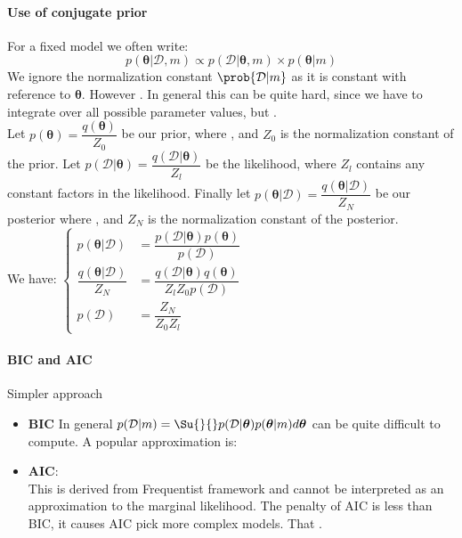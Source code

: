 \paragraph{Use of conjugate prior}
For a fixed model we often write:
$$p(\bm{\theta}|\mathcal{D},m) \propto p(\mathcal{D}|\bm{\theta},m)\times p(\bm{\theta}|m)$$
We ignore the normalization constant $\prob{\mathcal{D}|m}$ as it is constant with reference to
$\bm{\theta}$. However . In general this can
be quite hard, since we have to integrate over all possible parameter values, but .\\
Let $p(\bm{\theta})=\dfrac{q(\bm{\theta})}{Z_{0}}$ be our prior, where , and $Z_{0}$ is the normalization constant of the prior.
Let $p(\mathcal{D}|\bm{\theta})=\dfrac{q(\mathcal{D}|\bm{\theta})}{Z_{l}}$ be the 
likelihood, where $Z_{l}$ contains any constant factors in the likelihood. Finally let
$p(\bm{\theta}|\mathcal{D})=\dfrac{q(\bm{\theta}|\mathcal{D})}{Z_{N}}$ be our posterior
where , and $Z_{N}$ is the normalization constant of the posterior.\\
We have:
$
\begin{cases}
    p(\bm{\theta}|\mathcal{D}) &= \dfrac{p(\mathcal{D}|\bm{\theta})p(\bm{\theta})}{p(\mathcal{D})}\\
    \dfrac{q(\bm{\theta}|\mathcal{D})}{Z_{N}} &= \dfrac{q(\mathcal{D}|\bm{\theta})
	q(\bm{\theta})}{Z_{l}Z_{0}p(\mathcal{D})}\\
        p(\mathcal{D}) &= \dfrac{Z_{N}}{Z_{0}Z_{l}}
\end{cases}
$

 
\paragraph{BIC and AIC}
Simpler approach
\begin{itemize}
	\item \textbf{BIC} In general $p(\mathcal{D}|m) = \Su{}{}p(\mathcal{D}|\bm{\theta})p(\bm{\theta}|m)d\bm{
\theta}$ can be quite difficult to compute. A popular approximation is:
	\item \textbf{AIC}:
		\\
		This is derived from Frequentist framework and cannot be interpreted as 
		an approximation to the marginal likelihood. The penalty of AIC is less
		than BIC, it causes AIC pick more complex models. That .
\end{itemize}

